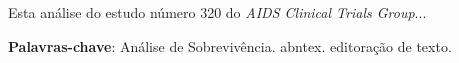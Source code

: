 \documentclass[
	12pt,				%
	openright,			%
	twoside,			%
	a4paper,			%
	english,			%
	brazil				%
	]{abntex2}
\begin{document}




\setlength{\absparsep}{18pt} %
\begin{resumo}
Esta análise do estudo número 320 do \textit{AIDS Clinical Trials Group}...

 \textbf{Palavras-chave}: Análise de Sobrevivência. abntex. editoração de texto.
\end{resumo}


 

 
\end{document}
